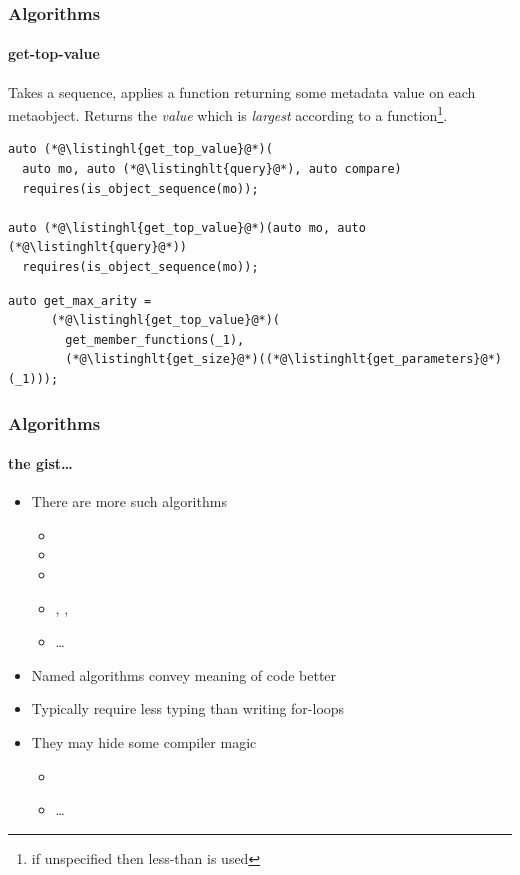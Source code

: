 \documentclass[compress,table,xcolor=table]{beamer}
\begin{document}
\begin{frame}[fragile]
  \frametitle{Algorithms}
  \framesubtitle{get-top-value}
  Takes a sequence, applies a  function returning some metadata
  value on each metaobject.
  Returns the {\em value} which is {\em largest} according
  to a  function\footnote{if unspecified then less-than is used}.
  \begin{lstlisting}[language=c++2x]
auto (*@\listinghl{get_top_value}@*)(
  auto mo, auto (*@\listinghlt{query}@*), auto compare)
  requires(is_object_sequence(mo));

auto (*@\listinghl{get_top_value}@*)(auto mo, auto (*@\listinghlt{query}@*))
  requires(is_object_sequence(mo));
  \end{lstlisting}
  \vfill
  \begin{lstlisting}[language=c++2x,basicstyle=\footnotesize\ttfamily]
    auto get_max_arity =
      (*@\listinghl{get_top_value}@*)(
        get_member_functions(_1),
        (*@\listinghlt{get_size}@*)((*@\listinghlt{get_parameters}@*)(_1)));
  \end{lstlisting}
\end{frame}
\begin{frame}
  \frametitle{Algorithms}
  \framesubtitle{the gist\ldots}
  \larger
  \begin{itemize}
    \item There are more such algorithms
    \begin{itemize}
      \item {}
      \item {}
      \item {}
      \item {}, , 
      \item \ldots
    \end{itemize}
    \item Named algorithms convey meaning of code better
    \item Typically require less typing than writing for-loops
    \item They may hide some compiler magic
    \begin{itemize}
      \item {}
      \item \ldots
    \end{itemize}
  \end{itemize}
\end{frame}
\end{document}

